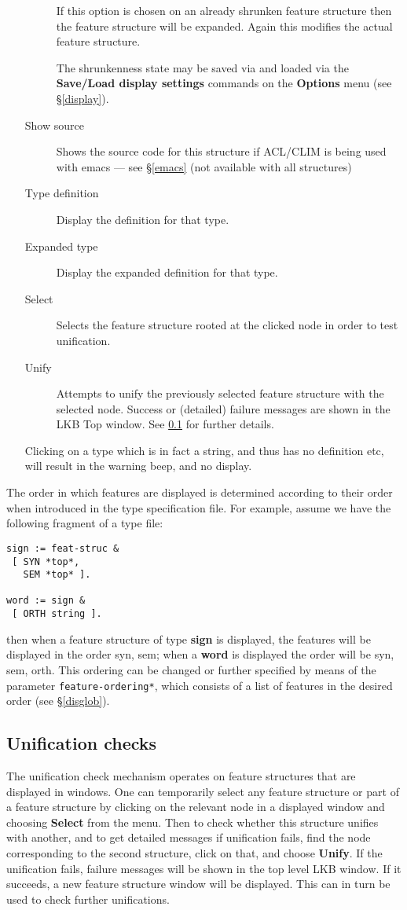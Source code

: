 \documentclass[12pt]{report}
\begin{document}
\begin{enumerate}
\begin{description}
If this option is chosen on an already shrunken feature structure then
the feature structure will be expanded.  Again this modifies the
actual feature structure.

The shrunkenness state may be saved via and loaded via the
{\bf Save/Load display settings} commands on the {\bf Options} menu
(see \S\ref{display}).
\item [Show source] Shows the source code for this structure 
if ACL/CLIM is being used with emacs --- see \S\ref{emacs} (not available
with all structures)
\item[Type definition] 
Display the definition for that type.
\item[Expanded type]
Display the expanded definition for that type.
\item[Select]  Selects the
feature structure rooted at the clicked node in order to test unification.
\item[Unify] Attempts to unify the previously selected feature structure
with the selected node.  Success or (detailed) failure messages
are shown in the LKB Top window.  See \ref{unifcheck} for further
details.
\end{description}
Clicking on a type which is in fact a string, and thus has no
definition etc, will result in the warning beep, and no display.
\end{enumerate}

The order in which features are displayed is determined according to
their order when introduced in the type specification file.  For
example, assume we have the following fragment of a type file:
\begin{verbatim}
sign := feat-struc &
 [ SYN *top*, 
   SEM *top* ].

word := sign &
 [ ORTH string ].
\end{verbatim}
then when a feature structure of type {\bf sign} is displayed, the
features will be displayed in the order {\sc syn}, {\sc sem}; when a {\bf
word} is displayed the order will be {\sc syn}, {\sc sem}, {\sc orth}.
This ordering can be changed or further specified by
means of the parameter {\tt *feature-ordering*}, which consists of
a list of features in the desired order (see \S\ref{disglob}).

\subsection{Unification checks}
\label{unifcheck}

The unification check mechanism operates on feature
structures that are displayed in windows.  One can
temporarily select any feature structure or part of a feature structure
by clicking on the relevant node in a displayed window and choosing
{\bf Select} from the menu.  Then to check whether this structure
unifies with another, and to get detailed messages if unification fails,
find the node corresponding to the second
structure, click on that, and choose {\bf Unify}.
If the unification fails, failure messages will be shown in the
top level LKB window.  If it succeeds, a new feature structure
window will be displayed.  This can in turn be used to check further
unifications.
\end{document}
